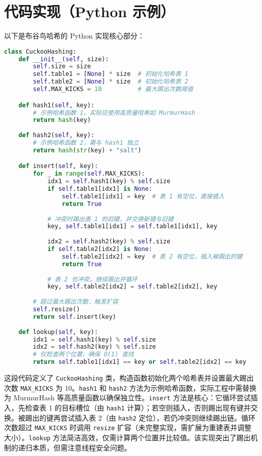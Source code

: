 \chapter{代码实现（Python 示例）}
以下是布谷鸟哈希的 Python 实现核心部分：\par
\begin{lstlisting}[language=python]
class CuckooHashing:
    def __init__(self, size):
        self.size = size
        self.table1 = [None] * size  # 初始化哈希表 1
        self.table2 = [None] * size  # 初始化哈希表 2
        self.MAX_KICKS = 10          # 最大踢出次数阈值

    def hash1(self, key): 
        # 示例哈希函数 1，实际应使用高质量哈希如 MurmurHash
        return hash(key) 
    
    def hash2(self, key): 
        # 示例哈希函数 2，需与 hash1 独立
        return hash(str(key) + "salt")

    def insert(self, key):
        for _ in range(self.MAX_KICKS):
            idx1 = self.hash1(key) % self.size
            if self.table1[idx1] is None:
                self.table1[idx1] = key  # 表 1 有空位，直接插入
                return True
            
            # 冲突时踢出表 1 的旧键，并交换新键与旧键
            key, self.table1[idx1] = self.table1[idx1], key
            
            idx2 = self.hash2(key) % self.size
            if self.table2[idx2] is None:
                self.table2[idx2] = key  # 表 2 有空位，插入被踢出的键
                return True
            
            # 表 2 也冲突，继续踢出并循环
            key, self.table2[idx2] = self.table2[idx2], key
        
        # 超过最大踢出次数，触发扩容
        self.resize()
        return self.insert(key)
    
    def lookup(self, key):
        idx1 = self.hash1(key) % self.size
        idx2 = self.hash2(key) % self.size
        # 仅检查两个位置，确保 O(1) 查找
        return self.table1[idx1] == key or self.table2[idx2] == key
\end{lstlisting}
这段代码定义了 \texttt{CuckooHashing} 类，构造函数初始化两个哈希表并设置最大踢出次数 \texttt{MAX\_{}KICKS} 为 10。\texttt{hash1} 和 \texttt{hash2} 方法为示例哈希函数，实际工程中需替换为 MurmurHash 等高质量函数以确保独立性。\texttt{insert} 方法是核心：它循环尝试插入，先检查表 1 的目标槽位（由 \texttt{hash1} 计算）；若空则插入，否则踢出现有键并交换。被踢出的键再尝试插入表 2（由 \texttt{hash2} 定位），若仍冲突则继续踢出链。循环次数超过 \texttt{MAX\_{}KICKS} 时调用 \texttt{resize} 扩容（未完整实现，需扩展为重建表并调整大小）。\texttt{lookup} 方法简洁高效，仅需计算两个位置并比较值。该实现突出了踢出机制的递归本质，但需注意线程安全问题。\par
